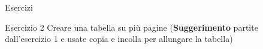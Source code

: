 \begin{frame}[fragile]{Esercizi}

\begin{block}{Esercizio 2}
	Creare una tabella su più pagine (\textbf{Suggerimento} partite
	dall'esercizio 1 e usate copia e incolla per allungare la tabella)
\end{block}

\end{frame}
